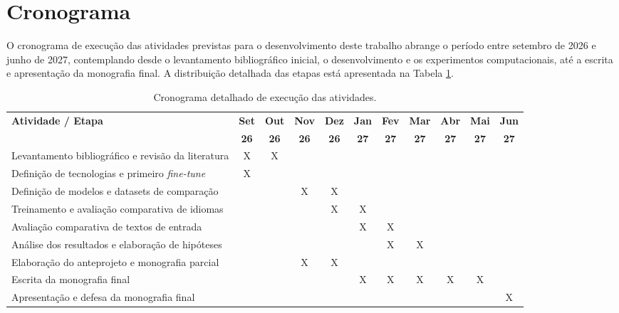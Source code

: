 \documentclass[12pt,a4paper]{article}
\begin{document}
\section{Cronograma}

O cronograma de execução das atividades previstas para o desenvolvimento deste trabalho abrange o período entre setembro de 2026 e junho de 2027, contemplando desde o levantamento bibliográfico inicial, o desenvolvimento e os experimentos computacionais, até a escrita e apresentação da monografia final. A distribuição detalhada das etapas está apresentada na Tabela \ref{tab:cronograma}.

\begin{table}[htbp]
\centering
\caption{Cronograma detalhado de execução das atividades.}
\label{tab:cronograma}
\begin{tabularx}{\textwidth}{X c c c c c c c c c c}
\toprule
\textbf{Atividade / Etapa} & \textbf{Set} & \textbf{Out} & \textbf{Nov} & \textbf{Dez} & \textbf{Jan} & \textbf{Fev} & \textbf{Mar} & \textbf{Abr} & \textbf{Mai} & \textbf{Jun} \\
& \textbf{26} & \textbf{26} & \textbf{26} & \textbf{26} & \textbf{27} & \textbf{27} & \textbf{27} & \textbf{27} & \textbf{27} & \textbf{27} \\
\midrule
Levantamento bibliográfico e revisão da literatura & X & X & & & & & & & & \\
Definição de tecnologias e primeiro \textit{fine-tune} & X & & & & & & & & & \\
Definição de modelos e datasets de comparação & & & X & X & & & & & & \\
Treinamento e avaliação comparativa de idiomas & & & & X & X & & & & & \\
Avaliação comparativa de textos de entrada & & & & & X & X & & & & \\
Análise dos resultados e elaboração de hipóteses & & & & & & X & X & & & \\
Elaboração do anteprojeto e monografia parcial & & & X & X & & & & & & \\
Escrita da monografia final & & & & & X & X & X & X & X & \\
Apresentação e defesa da monografia final & & & & & & & & & & X \\
\bottomrule
\end{tabularx}
\end{table}

\clearpage
{}


\end{document}

